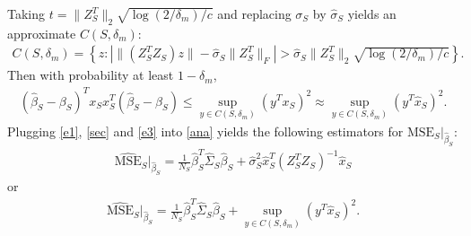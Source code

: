 \documentclass[11pt,a4paper]{amsart}
\numberwithin{equation}{section}
\theoremstyle{plain}
\theoremstyle{definition}
\def\mse{{\text{MSE}}}
\begin{document}
Taking $t = \|Z^T_S\|_2\sqrt{\log(2/\delta_m)/c}$ and replacing $\sigma_S$ by $\widehat{\sigma}_S$ yields an approximate $C(S,\delta_m)$:
\begin{align}
C(S,\delta_m) = \left\{z: \left|\|(Z_S^TZ_S)z\| -\widehat{\sigma}_S\|Z^T_S\|_F\right|>\widehat{\sigma}_S \|Z^T_S\|_2\sqrt{\log(2/\delta_m)/c}\right\}.\label{213}
\end{align}
Then with probability at least $1-\delta_m$, 
\begin{align}
(\widehat{\beta}_S-\beta_S)^Tx_Sx_S^T(\widehat{\beta}_S-\beta_S)\leq \sup_{y\in C(S,\delta_m)}(y^Tx_S)^2\approx \sup_{y\in C(S,\delta_m)}(y^T\widehat{x}_S)^2.  \label{usef}
\end{align}
Plugging \eqref{e1}, \eqref{sec} and \eqref{e3} into \eqref{ana} yields the following estimators for $\mse_S|_{\widehat{\beta}_S}$:
\begin{align}
\widehat{\mse}_S|_{\widehat{\beta}_S} = \frac{1}{N_S}\widehat{\beta}_S^T\widehat{\Sigma}_S\widehat{\beta}_S + \widehat{\sigma}_S^2\widehat{x}_S^T(Z_S^TZ_S)^{-1}\widehat{x}_S\label{001}
\end{align}
or
\begin{align}
\widehat{\mse}_S|_{\widehat{\beta}_S} = \frac{1}{N_S}\widehat{\beta}_S^T\widehat{\Sigma}_S\widehat{\beta}_S + \sup_{y\in C(S,\delta_m)}(y^T\widehat{x}_S)^2.\label{002}
\end{align}
\end{document}
